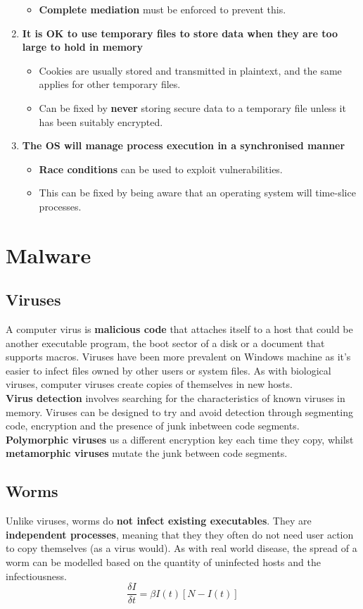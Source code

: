 \documentclass{article}
\newcommand{\np}{\vspace{8pt} \\}
\begin{document}
\begin{enumerate}
\begin{itemize}
		\item \textbf{Complete mediation} must be enforced to prevent this.
	\end{itemize}
	\item \textbf{It is OK to use temporary files to store data when they are too large to hold in memory}
	\begin{itemize}
		\item Cookies are usually stored and transmitted in plaintext, and the same applies for other temporary files.
		\item Can be fixed by \textbf{never} storing secure data to a temporary file unless it has been suitably encrypted.
	\end{itemize}
	\item \textbf{The OS will manage process execution in a synchronised manner}
	\begin{itemize}
		\item \textbf{Race conditions} can be used to exploit vulnerabilities.
		\item This can be fixed by being aware that an operating system will time-slice processes.
	\end{itemize}
\end{enumerate}

\section{Malware}

\subsection{Viruses}
A computer virus is \textbf{malicious code} that attaches itself to a host that could be another executable program, the boot sector of a disk or a document that supports macros. Viruses have been more prevalent on Windows machine as it's easier to infect files owned by other users or system files. As with biological viruses, computer viruses create copies of themselves in new hosts. \np
\textbf{Virus detection} involves searching for the characteristics of known viruses in memory. Viruses can be designed to try and avoid detection through segmenting code, encryption and the presence of junk inbetween code segments. \textbf{Polymorphic viruses} us a different encryption key each time they copy, whilst \textbf{metamorphic viruses} mutate the junk between code segments.

\subsection{Worms}
Unlike viruses, worms do \textbf{not infect existing executables}. They are \textbf{independent processes}, meaning that they they often do not need user action to copy themselves (as a virus would). As with real world disease, the spread of a worm can be modelled based on the quantity of uninfected hosts and the infectiousness.
\[
	\frac{\delta I}{\delta t} = \beta I(t) [N - I(t)]
\]
\end{document}
